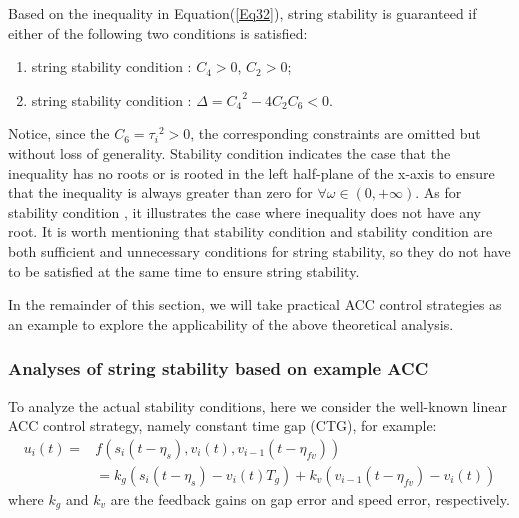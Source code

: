 \documentclass[journal]{IEEEtran}
\begin{document}
Based on the inequality in Equation(\ref{Eq32}), string stability is guaranteed if either of the following two conditions is satisfied:
\begin{enumerate}
  \item string stability condition \uppercase\expandafter{}: $C_4>0$, $C_2>0$;
  \item string stability condition \uppercase\expandafter{}: $\Delta={C_4}^2-4C_2C_6<0$.
\end{enumerate}

Notice, since the $C_6={\tau_i}^2>0$, the corresponding constraints are omitted but without loss of generality. Stability condition \uppercase\expandafter{} indicates the case that the inequality has no roots or is rooted in the left half-plane of the x-axis to ensure that the inequality is always greater than zero for $\forall\omega\in(0,+\infty)$. As for stability condition \uppercase\expandafter{}, it illustrates the case where inequality does not have any root. It is worth mentioning that stability condition \uppercase\expandafter{} and stability condition \uppercase\expandafter{} are both sufficient and unnecessary conditions for string stability, so they do not have to be satisfied at the same time to ensure string stability.

In the remainder of this section, we will take practical ACC control strategies as an example to explore the applicability of the above theoretical analysis.


\subsubsection{Analyses of string stability based on example ACC}
\label{Section 4.3.3}

To analyze the actual stability conditions, here we consider the well-known linear ACC control strategy, namely constant time gap (CTG), for example:
\begin{equation}
  \begin{aligned}
    u_i\left(t\right)= & f\left(s_i\left(t-\eta_s\right),v_i\left(t\right),v_{i-1}\left(t-\eta_{fv}\right)\right)                                         \\
                       & =k_g\left(s_i\left(t-\eta_s\right)-v_i\left(t\right)T_g\right)+k_v\left(v_{i-1}\left(t-\eta_{fv}\right)-v_i\left(t\right)\right)
  \end{aligned}
  \label{Eq33}
\end{equation}
where $k_g$ and $k_v$ are the feedback gains on gap error and speed error, respectively.
\end{document}

